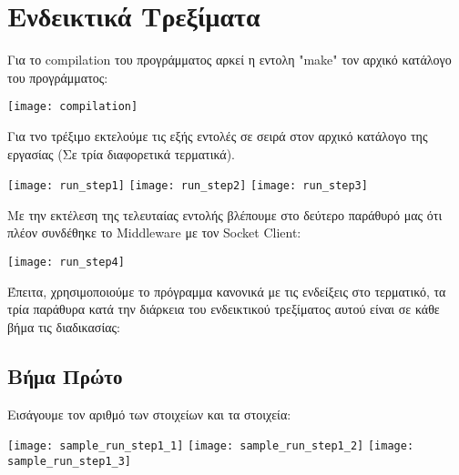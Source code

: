 \section{Ενδεικτικά Τρεξίματα}
Για το compilation του προγράμματος αρκεί η εντολη "make" τον αρχικό κατάλογο του
προγράμματος:
\\
\begin{center}
\texttt{[image: compilation]}
\end{center}
Για τνο τρέξιμο εκτελούμε τις εξής εντολές σε σειρά στον αρχικό κατάλογο της
εργασίας (Σε τρία διαφορετικά τερματικά).
\begin{center}
\texttt{[image: run\_step1]}
\texttt{[image: run\_step2]}
\texttt{[image: run\_step3]}
\end{center}
Με την εκτέλεση της τελευταίας εντολής βλέπουμε στο δεύτερο παράθυρό μας ότι
πλέον συνδέθηκε το Middleware με τον Socket Client:
\begin{center}
\texttt{[image: run\_step4]}
\end{center}
Έπειτα, χρησιμοποιούμε το πρόγραμμα κανονικά με τις ενδείξεις στο τερματικό,
τα τρία παράθυρα κατά την διάρκεια του ενδεικτικού τρεξίματος αυτού είναι σε
κάθε βήμα τις διαδικασίας:
\subsection{Βήμα Πρώτο}
Εισάγουμε τον αριθμό των στοιχείων και τα στοιχεία:
\begin{center}
\texttt{[image: sample\_run\_step1\_1]}
\texttt{[image: sample\_run\_step1\_2]}
\texttt{[image: sample\_run\_step1\_3]}
\end{center}
